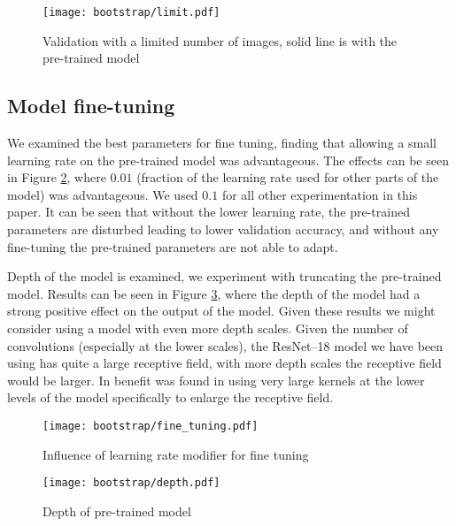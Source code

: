 \begin{figure}[ht]
\centering
\texttt{[image: bootstrap/limit.pdf]}
\caption{Validation with a limited number of images, solid line is with the pre-trained model}  
\label{fig:bootstrap_limited}
\end{figure}



\subsection{Model fine-tuning}

We examined the best parameters for fine tuning, finding that allowing a small learning rate on the pre-trained model was advantageous. The effects can be seen in Figure \ref{fig:bootstrap_fine}, where $0.01$ (fraction of the learning rate used for other parts of the model) was advantageous. We used $ 0.1 $ for all other experimentation in this paper. It can be seen that without the lower learning rate, the pre-trained parameters are disturbed leading to lower validation accuracy, and without any fine-tuning the pre-trained parameters are not able to adapt.

Depth of the model is examined, we experiment with truncating the pre-trained model. Results can be seen in Figure \ref{fig:bootstrap_depth}, where the depth of the model had a strong positive effect on the output of the model. Given these results we might consider using a model with even more depth scales. Given the number of convolutions (especially at the lower scales), the ResNet--18 model we have been using has quite a large receptive field, with more depth scales the receptive field would be larger. In \cite{Peng2017} benefit was found in using very large kernels at the lower levels of the model specifically to enlarge the receptive field.

\begin{figure*}[!ht]
\centering
\begin{subfigure}{.5\textwidth}
  \centering
  \texttt{[image: bootstrap/fine\_tuning.pdf]}
  \caption{Influence of learning rate modifier for fine tuning}  
  \label{fig:bootstrap_fine}
\end{subfigure}%
\begin{subfigure}{.5\textwidth}
  \centering
  \texttt{[image: bootstrap/depth.pdf]}
  \caption{Depth of pre-trained model}  
  \label{fig:bootstrap_depth}
\end{subfigure}

\label{fig:bootstrap_training}
\end{figure*}




